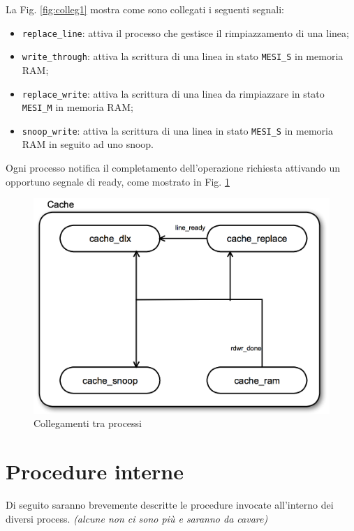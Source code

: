 La Fig. \ref{fig:colleg1} mostra come sono collegati i seguenti segnali:
\begin{itemize}
  \item \texttt{replace\_line}: attiva il processo che gestisce il rimpiazzamento di una linea;
  \item \texttt{write\_through}: attiva la scrittura di una linea in stato \texttt{MESI\_S} in memoria RAM;
  \item \texttt{replace\_write}: attiva la scrittura di una linea da rimpiazzare in stato \texttt{MESI\_M} in memoria RAM;
  \item \texttt{snoop\_write}: attiva la scrittura di una linea in stato \texttt{MESI\_S} in memoria RAM in seguito ad uno snoop.
\end{itemize}

Ogni processo notifica il completamento dell'operazione richiesta attivando un opportuno segnale di ready, come mostrato in Fig. \ref{fig:colleg2}

\begin{figure}[h!]
\centering
\includegraphics[width=\textwidth]{img/cache/collegamenti2.png}
\caption{Collegamenti tra processi}
\label{fig:colleg2}
\end{figure}


\section{Procedure interne}

Di seguito saranno brevemente descritte le procedure invocate all'interno dei diversi process. \emph{(alcune non ci sono pi\`u e saranno da cavare)}



